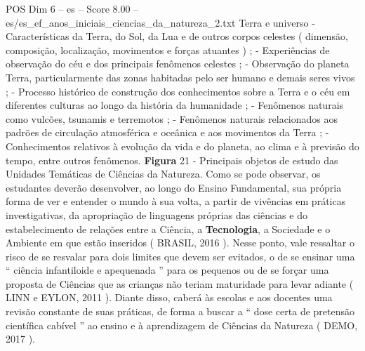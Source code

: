 \begin{textsample}{POS Dim 6 – es – Score 8.00 – es/es\_ef\_anos\_iniciais\_ciencias\_da\_natureza\_2.txt}
Terra e universo - Características da Terra, do Sol, da Lua e de outros corpos celestes ( dimensão, composição, localização, movimentos e forças atuantes ) ; - Experiências de observação do céu e dos principais fenômenos celestes ; - Observação do planeta Terra, particularmente das zonas habitadas pelo ser humano e demais seres vivos ; - Processo histórico de construção dos conhecimentos sobre a Terra e o céu em diferentes culturas ao longo da história da humanidade ; - Fenômenos naturais como vulcões, tsunamis e terremotos ; - Fenômenos naturais relacionados aos padrões de circulação atmosférica e oceânica e aos movimentos da Terra ; - Conhecimentos relativos à evolução da vida e do planeta, ao clima e à previsão do tempo, entre outros fenômenos. \textbf{Figura} 21 - Principais objetos de estudo das Unidades Temáticas de Ciências da Natureza.
Como se pode observar, os estudantes deverão desenvolver, ao longo do Ensino Fundamental, sua própria forma de ver e entender o mundo à sua volta, a partir de vivências em práticas investigativas, da apropriação de linguagens próprias das ciências e do estabelecimento de relações entre a Ciência, a \textbf{Tecnologia}, a Sociedade e o Ambiente em que estão inseridos ( BRASIL, 2016 ).
Nesse ponto, vale ressaltar o risco de se resvalar para dois limites que devem ser evitados, o de se ensinar uma “ ciência infantiloide e apequenada ” para os pequenos ou de se forçar uma proposta de Ciências que as crianças não teriam maturidade para levar adiante ( LINN e EYLON, 2011 ).
Diante disso, caberá às escolas e aos docentes uma revisão constante de suas práticas, de forma a buscar a “ dose certa de pretensão científica cabível ” ao ensino e à aprendizagem de Ciências da Natureza ( DEMO, 2017 ).

\end{textsample}

